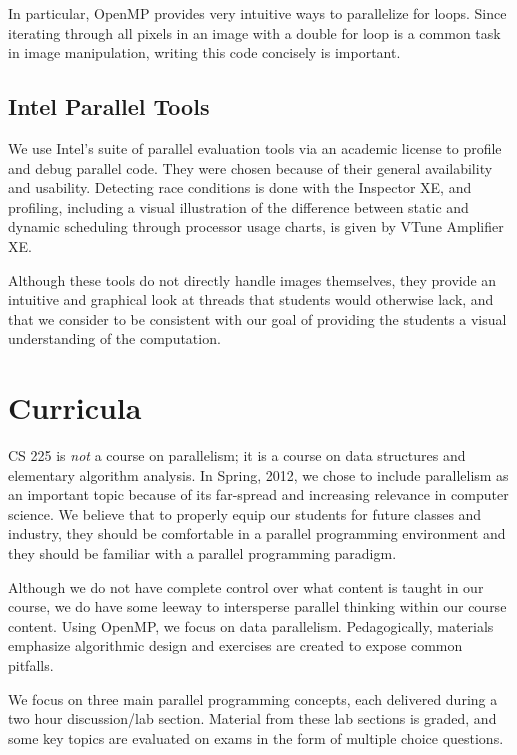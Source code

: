 \documentclass[conference]{./IEEEtran}
\begin{document}
In particular, OpenMP provides very intuitive ways to parallelize for loops.
Since iterating through all pixels in an image with a double for loop is a
common task in image manipulation, writing this code concisely is important.

\subsection{Intel Parallel Tools}

We use Intel's suite of parallel evaluation tools via an academic license to
profile and debug parallel code.  They were chosen because of  their general
availability and usability. Detecting race conditions is done with the Inspector
XE\cite{inspector},  and profiling, including a visual illustration of the
difference between static and dynamic scheduling through processor usage charts,
is given by VTune Amplifier XE\cite{amplifier}.

Although these tools do not directly handle images themselves, they provide an
intuitive and graphical look at threads that students would otherwise lack, and
that we consider to be consistent with our goal of providing the students a
visual understanding of the computation.

\section{Curricula}

CS 225 is \emph{not} a course on parallelism; it is a course on data structures
and elementary algorithm analysis. In Spring, 2012, we chose to include
parallelism as an important topic because of its far-spread and increasing
relevance in computer science. We believe that to properly equip our students
for future classes and industry, they should be comfortable in a parallel
programming environment and they should be familiar with a parallel programming
paradigm.

Although we do not have complete control over what content is taught in our
course, we do have some leeway to intersperse parallel thinking within our
course content. Using OpenMP, we focus on data parallelism.  Pedagogically,
materials emphasize algorithmic design and exercises are created to expose
common pitfalls.

We focus on three main parallel programming concepts, each delivered during a
two hour discussion/lab section. Material from these lab sections is graded, and
some key topics are evaluated on exams in the form of multiple choice questions.
\end{document}
